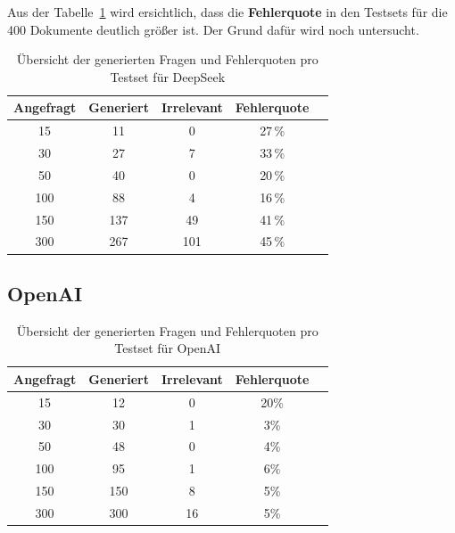 Aus der Tabelle~\ref{tab:deepseek_questions_overview} wird ersichtlich, dass die \textbf{Fehlerquote} in den Testsets für die 400 Dokumente deutlich größer ist. Der Grund dafür wird noch untersucht.

\begin{table}[htbp]
    \centering
    \caption[DeepSeek Übersicht Fehlerquote für Fragen]{Übersicht der generierten Fragen und Fehlerquoten pro Testset für DeepSeek}
    \begin{tabular}{|c|c|c|c|c|}
        \hline
        \textbf{Angefragt} & \textbf{Generiert} & \textbf{Irrelevant} & \textbf{Fehlerquote} \\
        \hline
        15   & 11  & 0   & 27\,\% \\
        30   & 27  & 7   & 33\,\% \\
        50   & 40  & 0   & 20\,\% \\
        100  & 88  & 4   & 16\,\% \\
        150  & 137 & 49  & 41\,\% \\
        300  & 267 & 101 & 45\,\% \\
        \hline
    \end{tabular}
    \label{tab:deepseek_questions_overview}
\end{table}

\subsection{OpenAI}

\begin{table}[htbp]
    \centering
    \caption[OpenAI Übersicht Fehlerquote für Fragen]{Übersicht der generierten Fragen und Fehlerquoten pro Testset für OpenAI}
    \begin{tabular}{|c|c|c|c|c|}
        \hline
        \textbf{Angefragt} & \textbf{Generiert} & \textbf{Irrelevant} & \textbf{Fehlerquote} \\
        \hline
        15   & 12   & 0   & 20\% \\
        30   & 30   & 1   & 3\%  \\
        50   & 48   & 0   & 4\%  \\
        100  & 95   & 1   & 6\%  \\
        150  & 150  & 8   & 5\%  \\
        300  & 300  & 16  & 5\%  \\
        \hline
    \end{tabular}
    \label{tab:openai_questions_overview}
\end{table}

